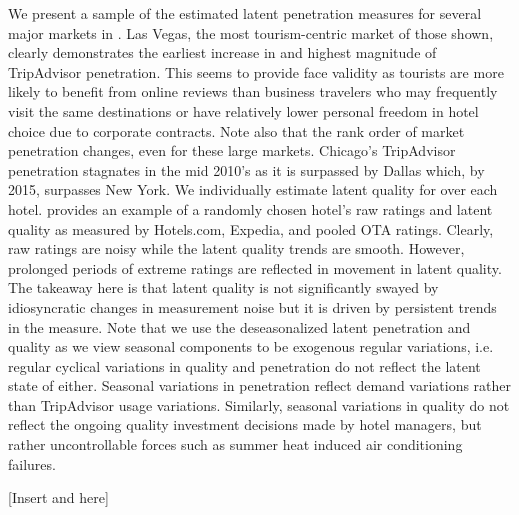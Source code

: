 \documentclass[mksc,blindrev]{informs3} %
\begin{document}
We present a sample of the estimated latent penetration measures for several major markets in . Las Vegas, the most tourism-centric market of those shown, clearly demonstrates the earliest increase in and highest magnitude of TripAdvisor penetration. This seems to provide face validity as tourists are more likely to benefit from online reviews than business travelers who may frequently visit the same destinations or have relatively lower personal freedom in hotel choice due to corporate contracts. Note also that the rank order of market penetration changes, even for these large markets. Chicago's TripAdvisor penetration stagnates in the mid 2010's as it is surpassed by Dallas which, by 2015, surpasses New York. We individually estimate latent quality for over each hotel.  provides an example of a randomly chosen hotel's raw ratings and latent quality as measured by Hotels.com, Expedia, and pooled OTA ratings. Clearly, raw ratings are noisy while the latent quality trends are smooth. However, prolonged periods of extreme ratings are reflected in movement in latent quality. The takeaway here is that latent quality is not significantly swayed by idiosyncratic changes in measurement noise but it is driven by persistent trends in the measure. Note that we use the deseasonalized latent penetration and quality as we view seasonal components to be exogenous regular variations, i.e. regular cyclical variations in quality and penetration do not reflect the latent state of either. Seasonal variations in penetration reflect demand variations rather than TripAdvisor usage variations. Similarly, seasonal variations in quality do not reflect the ongoing quality investment decisions made by hotel managers, but rather uncontrollable forces such as summer heat induced air conditioning failures.

[Insert  and  here]
\end{document}
